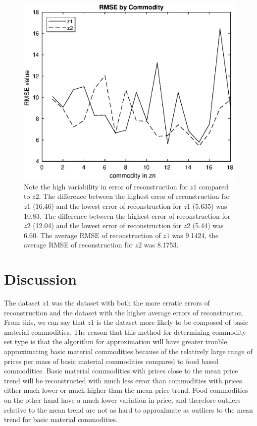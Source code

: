 \documentclass{article}
\begin{document}
	\begin{figure}[H]
		\centering
		\includegraphics{figure2}
		\caption{Note the high variability in error of reconstruction for $z1$ compared to $z2$. The difference between the highest error of reconstruction for $z1$ (16.46) and the lowest error of reconstruction for $z1$ (5.635) was 10.83. The difference between the highest error of reconstruction for $z2$ (12.04) and the lowest error of reconstruction for $z2$ (5.44) was 6.60. The average RMSE of reconstruction of $z1$ was 9.1424, the average RMSE of reconstruction for $z2$ was 8.1753.}
	\end{figure}
	\section*{Discussion}
	The dataset $z1$ was the dataset with both the more erratic errors of reconstruction and the dataset with the higher average errors of reconstructon. From this, we can say that $z1$ is the dataset more likely to be composed of basic material commodities. The reason that this method for determining commodity set type is that the algorithm for approximation will have greater trouble approximating basic material commodities because of the relatively large range of prices per mass of basic material commodities compared to food based commodities. Basic material commodities with prices close to the mean price trend will be reconstructed with much less error than commodities with prices either much lower or much higher than the mean price trend. Food commodities on the other hand have a much lower variation in price, and therefore outliers relative to the mean trend are not as hard to approximate as outliers to the mean trend for basic material commodities. 
\end{document}
